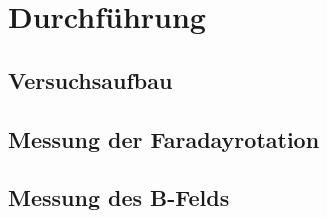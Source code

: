 \section{Durchführung}
\label{sec:Durchführung}

\subsection{Versuchsaufbau}
\label{subsec:Versuchsaufbau}

\subsection{Messung der Faradayrotation}
\label{subsec:Messung der Faradayrotation}

\subsection{Messung des \textbf{B}-Felds}
\label{subsec:Messung des B-Felds}